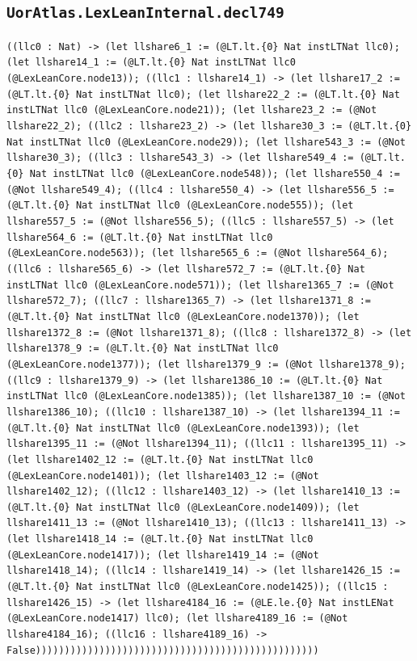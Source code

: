 \documentclass[11pt]{article}
\begin{document}
\subsection*{\texttt{UorAtlas.LexLeanInternal.decl749}}
\noindent\texttt{((llc0 : Nat) -> (let llshare6\_1 := (@LT.lt.\{0\} Nat instLTNat llc0); (let llshare14\_1 := (@LT.lt.\{0\} Nat instLTNat llc0 (@LexLeanCore.node13)); ((llc1 : llshare14\_1) -> (let llshare17\_2 := (@LT.lt.\{0\} Nat instLTNat llc0); (let llshare22\_2 := (@LT.lt.\{0\} Nat instLTNat llc0 (@LexLeanCore.node21)); (let llshare23\_2 := (@Not llshare22\_2); ((llc2 : llshare23\_2) -> (let llshare30\_3 := (@LT.lt.\{0\} Nat instLTNat llc0 (@LexLeanCore.node29)); (let llshare543\_3 := (@Not llshare30\_3); ((llc3 : llshare543\_3) -> (let llshare549\_4 := (@LT.lt.\{0\} Nat instLTNat llc0 (@LexLeanCore.node548)); (let llshare550\_4 := (@Not llshare549\_4); ((llc4 : llshare550\_4) -> (let llshare556\_5 := (@LT.lt.\{0\} Nat instLTNat llc0 (@LexLeanCore.node555)); (let llshare557\_5 := (@Not llshare556\_5); ((llc5 : llshare557\_5) -> (let llshare564\_6 := (@LT.lt.\{0\} Nat instLTNat llc0 (@LexLeanCore.node563)); (let llshare565\_6 := (@Not llshare564\_6); ((llc6 : llshare565\_6) -> (let llshare572\_7 := (@LT.lt.\{0\} Nat instLTNat llc0 (@LexLeanCore.node571)); (let llshare1365\_7 := (@Not llshare572\_7); ((llc7 : llshare1365\_7) -> (let llshare1371\_8 := (@LT.lt.\{0\} Nat instLTNat llc0 (@LexLeanCore.node1370)); (let llshare1372\_8 := (@Not llshare1371\_8); ((llc8 : llshare1372\_8) -> (let llshare1378\_9 := (@LT.lt.\{0\} Nat instLTNat llc0 (@LexLeanCore.node1377)); (let llshare1379\_9 := (@Not llshare1378\_9); ((llc9 : llshare1379\_9) -> (let llshare1386\_10 := (@LT.lt.\{0\} Nat instLTNat llc0 (@LexLeanCore.node1385)); (let llshare1387\_10 := (@Not llshare1386\_10); ((llc10 : llshare1387\_10) -> (let llshare1394\_11 := (@LT.lt.\{0\} Nat instLTNat llc0 (@LexLeanCore.node1393)); (let llshare1395\_11 := (@Not llshare1394\_11); ((llc11 : llshare1395\_11) -> (let llshare1402\_12 := (@LT.lt.\{0\} Nat instLTNat llc0 (@LexLeanCore.node1401)); (let llshare1403\_12 := (@Not llshare1402\_12); ((llc12 : llshare1403\_12) -> (let llshare1410\_13 := (@LT.lt.\{0\} Nat instLTNat llc0 (@LexLeanCore.node1409)); (let llshare1411\_13 := (@Not llshare1410\_13); ((llc13 : llshare1411\_13) -> (let llshare1418\_14 := (@LT.lt.\{0\} Nat instLTNat llc0 (@LexLeanCore.node1417)); (let llshare1419\_14 := (@Not llshare1418\_14); ((llc14 : llshare1419\_14) -> (let llshare1426\_15 := (@LT.lt.\{0\} Nat instLTNat llc0 (@LexLeanCore.node1425)); ((llc15 : llshare1426\_15) -> (let llshare4184\_16 := (@LE.le.\{0\} Nat instLENat (@LexLeanCore.node1417) llc0); (let llshare4189\_16 := (@Not llshare4184\_16); ((llc16 : llshare4189\_16) -> False)))))))))))))))))))))))))))))))))))))))))))))))))}\par
\end{document}
